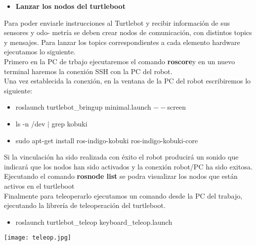 \documentclass[12pt,a4paper]{article}
\begin{document}
\begin{itemize}
\begin{itemize}
\item \textbf{Lanzar los nodos del turtleboot}
\end{itemize}

Para poder enviarle instrucciones al Turtlebot y recibir información de sus sensores y odo-
metría se deben crear nodos de comunicación, con distintos topics y mensajes. Para lanzar los topics
correspondientes a cada elemento hardware ejecutamos lo siguiente.\\
Primero en la PC de trbajo ejecutaremos el comando \textbf{roscore}y en un nuevo terminal haremos la conexión SSH con la PC del robot.\\
Una vez establecida la conexión, en la ventana de la PC del robot escribiremos lo siguiente:
\begin{itemize}
\item roslaunch turtlebot\_bringup minimal.launch $--$screen
\item ls -n /dev $|$ grep kobuki
\item sudo apt-get install ros-indigo-kobuki ros-indigo-kobuki-core

\end{itemize}
Si la vinculación ha sido realizada con éxito el robot producirá un sonido que indicará que los nodos han sido activados y la conexión robot/PC ha sido exitosa.\\
Ejecutando el comando \textbf{rosnode list} se podra visualizar los nodos que están activos en el turtleboot\\
Finalmente para teleoperarlo ejecutamos un comando desde la PC del trabajo, ejecutando la librería de teleoperación del turtleboot.
\begin{itemize}
\item roslaunch turtlebot\_teleop keyboard\_teleop.launch
\end{itemize}
\begin{center}
\texttt{[image: teleop.jpg]}
\end{center}

\end{itemize}
\end{document}
